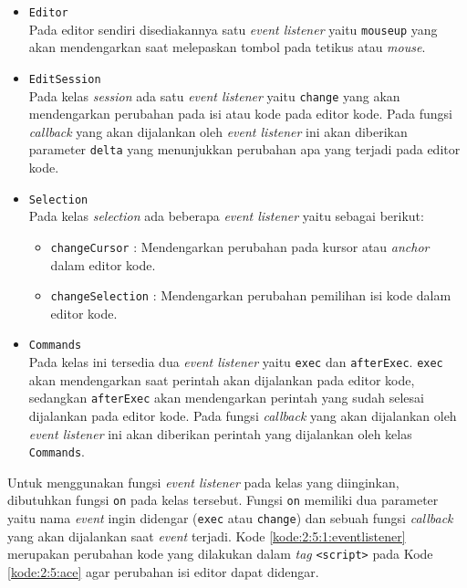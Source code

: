 \begin{itemize}
	\item \verb|Editor| \\
	      Pada editor sendiri disediakannya satu \textit{event listener} yaitu \verb|mouseup| yang akan mendengarkan saat melepaskan tombol pada tetikus atau \textit{mouse}.

	\item \verb|EditSession| \\
	      Pada kelas \textit{session} ada satu \textit{event listener} yaitu \verb|change| yang akan mendengarkan perubahan pada isi atau kode pada editor kode. Pada fungsi \textit{callback} yang akan dijalankan oleh \textit{event listener} ini akan diberikan parameter \verb|delta| yang menunjukkan perubahan apa yang terjadi pada editor kode.

	\item \verb|Selection| \\
	      Pada kelas \textit{selection} ada beberapa \textit{event listener} yaitu sebagai berikut:

	      \begin{itemize}
		      \item \verb|changeCursor| : Mendengarkan perubahan pada kursor atau \textit{anchor} dalam editor kode.
		      \item \verb|changeSelection| : Mendengarkan perubahan pemilihan isi kode dalam editor kode.
	      \end{itemize}

	\item \verb|Commands| \\
	      Pada kelas ini tersedia dua \textit{event listener} yaitu \verb|exec| dan \verb|afterExec|. \verb|exec| akan mendengarkan saat perintah akan dijalankan pada editor kode, sedangkan \verb|afterExec| akan mendengarkan perintah yang sudah selesai dijalankan pada editor kode. Pada fungsi \textit{callback} yang akan dijalankan oleh \textit{event listener} ini akan diberikan perintah yang dijalankan oleh kelas \verb|Commands|.
\end{itemize}

Untuk menggunakan fungsi \textit{event listener} pada kelas yang diinginkan, dibutuhkan fungsi \verb|on| pada kelas tersebut. Fungsi \verb|on| memiliki dua parameter yaitu nama \textit{event} ingin didengar (\verb|exec| atau \verb|change|) dan sebuah fungsi \textit{callback} yang akan dijalankan saat \textit{event} terjadi. Kode \ref{kode:2:5:1:eventlistener} merupakan perubahan kode yang dilakukan dalam \textit{tag} \verb|<script>| pada Kode \ref{kode:2:5:ace} agar perubahan isi editor dapat didengar.

